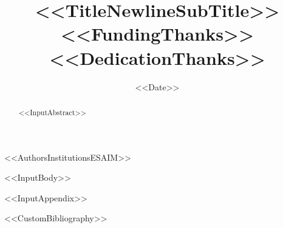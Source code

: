\documentclass[<<DocumentClassOptions>>]{m2an}
\begin{document}
\title{<<TitleNewlineSubTitle>><<FundingThanks>><<DedicationThanks>>}

<<AuthorsInstitutionsESAIM>>

\date{<<Date>>}



\begin{abstract}
<<InputAbstract>>
\end{abstract}

\maketitle

<<InputBody>>

\appendix
<<InputAppendix>>


<<CustomBibliography>>
\end{document}
